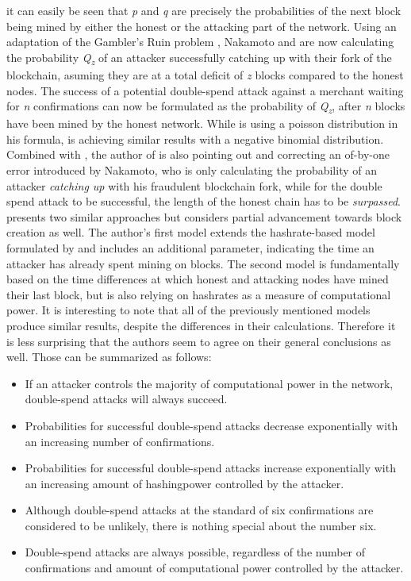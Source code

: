 \documentclass[a4paper,12pt,twoside]{report}
\begin{document}
it can easily be seen that \textit{p} and \textit{q} are precisely the probabilities of the next block being mined by either the honest or the attacking part of the network. Using an adaptation of the Gambler's Ruin problem \cite{gamblersruin}, Nakamoto and \cite{HBDSA} are now calculating the probability \textit{Q\textsubscript{z}} of an attacker successfully catching up with their fork of the blockchain, asuming they are at a total deficit of \textit{z} blocks compared to the honest nodes. The success of a potential double-spend attack against a merchant waiting for \textit{n} confirmations can now be formulated as the probability of \textit{Q\textsubscript{z}}, after \textit{n} blocks have been mined by the honest network. While \cite{nakamoto2008bitcoin} is using a poisson distribution in his formula, \cite{HBDSA} is achieving similar results with a negative binomial distribution. Combined with \cite{NakamotoDSACorrection}, the author of \cite{HBDSA} is also pointing out and correcting an of-by-one error introduced by Nakamoto, who is only calculating the probability of an attacker \textit{catching up} with his fraudulent blockchain fork, while for the double spend attack to be successful, the length of the honest chain has to be \textit{surpassed}. \cite{DSAwithTime} presents two similar approaches but considers partial advancement towards block creation as well. The author's first model extends the hashrate-based model formulated by \cite{HBDSA} and includes an additional parameter, indicating the time an attacker has already spent mining on blocks. The second model is fundamentally based on the time differences at which honest and attacking nodes have mined their last block, but is also relying on hashrates as a measure of computational power.
It is interesting to note that all of the previously mentioned models produce similar results, despite the differences in their calculations. Therefore it is less surprising that the authors seem to agree on their general conclusions as well. Those can be summarized as follows:
\begin{itemize}
\item If an attacker controls the majority of computational power in the network, double-spend attacks will always succeed.
\item Probabilities for successful double-spend attacks decrease exponentially with an increasing number of confirmations.
\item Probabilities for successful double-spend attacks increase exponentially with an increasing amount of hashingpower controlled by the attacker.
\item Although double-spend attacks at the standard of six confirmations are considered to be unlikely, there is nothing special about the number six.
\item Double-spend attacks are always possible, regardless of the number of confirmations and amount of computational power controlled by the attacker.
\end{itemize}
\end{document}
